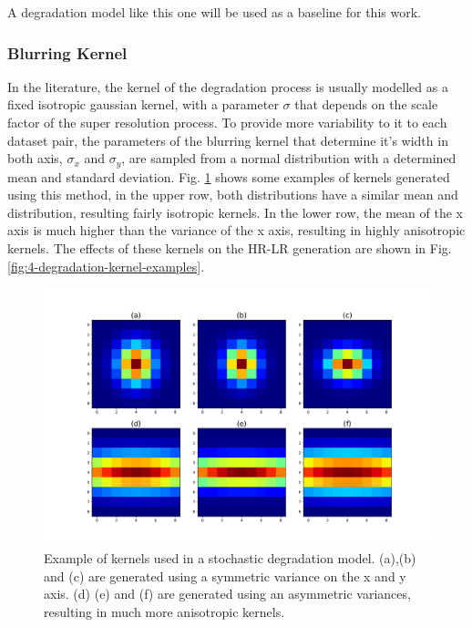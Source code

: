         A degradation model like this one will be used as a baseline for this work.
        

        \subsubsection{Blurring Kernel}

        In the literature, the kernel of the degradation process is usually modelled as a fixed isotropic gaussian kernel, with a parameter $\sigma$ that depends on the scale factor of the super resolution process.
        To provide more variability to it to each dataset pair, the parameters of the blurring kernel that determine it's width in both axis, $\sigma_x$ and $\sigma_y$, are sampled from a normal distribution with a determined mean and standard deviation. Fig. \ref{fig:4-degradation_kernels} shows some examples of kernels generated using this method, in the upper row, both distributions have a similar mean and distribution, resulting fairly isotropic kernels. In the lower row, the mean of the x axis is much higher than the variance of the x axis, resulting in highly anisotropic kernels. The effects of these kernels on the HR-LR generation are shown in Fig. \ref{fig:4-degradation-kernel-examples}.



        \begin{figure}[H]
                \centering
                \includegraphics[width=\linewidth]{Includes/4-degradation_kernels.pdf}
                \caption{Example of kernels used in a stochastic degradation model. (a),(b) and (c) are generated using a symmetric variance on the x and y axis. (d) (e) and (f) are generated using an asymmetric variances, resulting in much more anisotropic kernels.}
                \label{fig:4-degradation_kernels}
            \end{figure}

